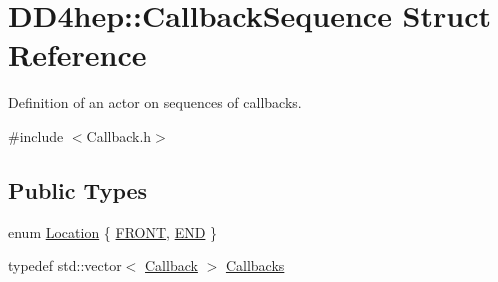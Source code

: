 \hypertarget{struct_d_d4hep_1_1_callback_sequence}{
\section{DD4hep::CallbackSequence Struct Reference}
\label{struct_d_d4hep_1_1_callback_sequence}
}


Definition of an actor on sequences of callbacks.  


{\ttfamily \#include $<$Callback.h$>$}\subsection*{Public Types}
\begin{DoxyCompactItemize}
\item 
enum \hyperlink{struct_d_d4hep_1_1_callback_sequence_a7753490247479633aed16a2376821ef7}{Location} \{ \hyperlink{struct_d_d4hep_1_1_callback_sequence_a7753490247479633aed16a2376821ef7a3aef5fe72e4b9e6f6f4b20a655e78ef2}{FRONT}, 
\hyperlink{struct_d_d4hep_1_1_callback_sequence_a7753490247479633aed16a2376821ef7ac39eeb1bcfc1c235ab1d0d9315c310ac}{END}
 \}
\item 
typedef std::vector$<$ \hyperlink{class_d_d4hep_1_1_callback}{Callback} $>$ \hyperlink{struct_d_d4hep_1_1_callback_sequence_a2d9d9488b193731498c4b9cc0fdc4a6b}{Callbacks}
\end{DoxyCompactItemize}
